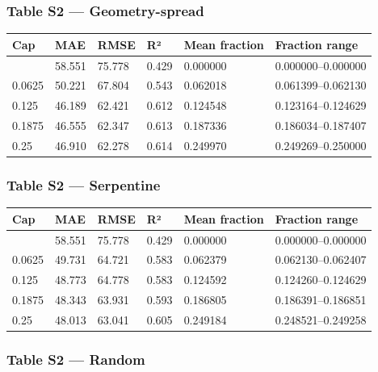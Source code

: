 \documentclass[11pt,a4paper]{article}
\begin{document}
\subsubsection{Table S2 --- Geometry-spread}\label{table-s2-geometry-spread}

{ %
\begin{longtable}[]{@{}llllll@{}}
\toprule\noalign{}
Cap & MAE & RMSE & R² & Mean fraction & Fraction range \\
\midrule\noalign{}
\endhead
\bottomrule\noalign{}
\endlastfoot
0.0 & 58.551 & 75.778 & 0.429 & 0.000000 & 0.000000--0.000000 \\
0.0625 & 50.221 & 67.804 & 0.543 & 0.062018 & 0.061399--0.062130 \\
0.125 & 46.189 & 62.421 & 0.612 & 0.124548 & 0.123164--0.124629 \\
0.1875 & 46.555 & 62.347 & 0.613 & 0.187336 & 0.186034--0.187407 \\
0.25 & 46.910 & 62.278 & 0.614 & 0.249970 & 0.249269--0.250000 \\
\end{longtable}
}

\subsubsection{Table S2 --- Serpentine}\label{table-s2-serpentine}

{ %
\begin{longtable}[]{@{}llllll@{}}
\toprule\noalign{}
Cap & MAE & RMSE & R² & Mean fraction & Fraction range \\
\midrule\noalign{}
\endhead
\bottomrule\noalign{}
\endlastfoot
0.0 & 58.551 & 75.778 & 0.429 & 0.000000 & 0.000000--0.000000 \\
0.0625 & 49.731 & 64.721 & 0.583 & 0.062379 & 0.062130--0.062407 \\
0.125 & 48.773 & 64.778 & 0.583 & 0.124592 & 0.124260--0.124629 \\
0.1875 & 48.343 & 63.931 & 0.593 & 0.186805 & 0.186391--0.186851 \\
0.25 & 48.013 & 63.041 & 0.605 & 0.249184 & 0.248521--0.249258 \\
\end{longtable}
}

\subsubsection{Table S2 --- Random}\label{table-s2-random}
\end{document}
